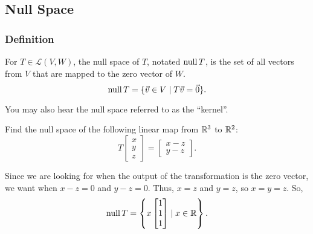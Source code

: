 \subsection{Null Space}

\subsubsection{Definition}
\begin{definition}
	For $T \in \mathcal{L}(V,W)$, the null space of $T$, notated $\operatorname{null}{T}$, is the set of all vectors from $V$ that are mapped to the zero vector of $W$.
	\begin{equation*}
		\operatorname{null}{T} = \{\vec{v} \in V \mid T\vec{v} = \vec{0}\}.
	\end{equation*}
\end{definition}
You may also hear the null space referred to as the ``kernel''.

\begin{example}
	Find the null space of the following linear map from $\mathbb{R}^3$ to $\mathbb{R}^2$:
	\begin{equation*}
		T\begin{bmatrix}
			x \\ y \\ z
		\end{bmatrix} = \begin{bmatrix}
			x-z \\ y-z
	\end{bmatrix}.
	\end{equation*}
\end{example}
\begin{answer}
	Since we are looking for when the output of the transformation is the zero vector, we want when $x-z = 0$ and $y-z = 0$.
	Thus, $x=z$ and $y=z$, so $x=y=z$.
	So,
	\begin{equation*}
		\operatorname{null}{T} = \left\{x\begin{bmatrix}
			1 \\ 1 \\ 1
		\end{bmatrix} \mid x \in \mathbb{R}\right\}.
	\end{equation*}
\end{answer}

